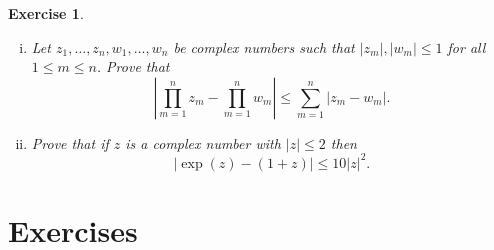 \documentclass[12pt]{article}
\newtheorem{exercise}[thm]{Exercise}
\theoremstyle{example}
\begin{document}
\begin{exercise}
\begin{enumerate}[(i)]
\item Let $z_1,\ldots,z_n, w_1,\ldots, w_n$ be complex numbers such that $|z_m|, |w_m|\le 1$ for all $1\le m\le n$. Prove that
$$ \left|\prod_{m=1}^n z_m - \prod_{m=1}^n w_m \right| \le \sum_{m=1}^n |z_m-w_m|. $$
\item Prove that if $z$ is a complex number with $|z|\le 2$ then
$$ |\exp(z)-(1+z)| \le 10 |z|^2. $$
\end{enumerate}
\end{exercise}



%
%




\newpage
\section*{Exercises} 
\end{document}
